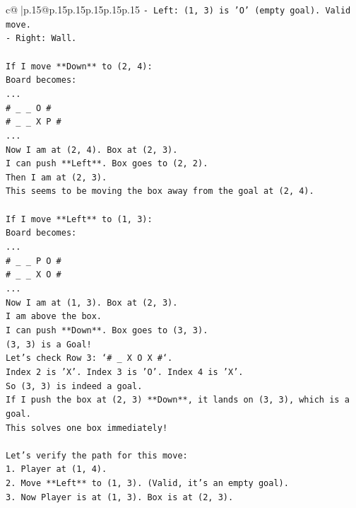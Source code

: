 \documentclass{article}
\begin{document}
{\begin{supertabular}{c@{$\;$}|p{.15\linewidth}@{}p{.15\linewidth}p{.15\linewidth}p{.15\linewidth}p{.15\linewidth}p{.15\linewidth}}
{{{\texttt{{-} Left: (1, 3) is 'O' (empty goal). Valid move.} \\
\texttt{{-} Right: Wall.} \\
\\ 
\texttt{If I move **Down** to (2, 4):} \\
\texttt{Board becomes:} \\
\texttt{...} \\
\texttt{\# \_ \_ O \#} \\
\texttt{\# \_ \_ X P \#} \\
\texttt{...} \\
\texttt{Now I am at (2, 4). Box at (2, 3).} \\
\texttt{I can push **Left**. Box goes to (2, 2).} \\
\texttt{Then I am at (2, 3).} \\
\texttt{This seems to be moving the box away from the goal at (2, 4).} \\
\\ 
\texttt{If I move **Left** to (1, 3):} \\
\texttt{Board becomes:} \\
\texttt{...} \\
\texttt{\# \_ \_ P O \#} \\
\texttt{\# \_ \_ X O \#} \\
\texttt{...} \\
\texttt{Now I am at (1, 3). Box at (2, 3).} \\
\texttt{I am above the box.} \\
\texttt{I can push **Down**. Box goes to (3, 3).} \\
\texttt{(3, 3) is a Goal!} \\
\texttt{Let's check Row 3: `\# \_ X O X \#`.} \\
\texttt{Index 2 is 'X'. Index 3 is 'O'. Index 4 is 'X'.} \\
\texttt{So (3, 3) is indeed a goal.} \\
\texttt{If I push the box at (2, 3) **Down**, it lands on (3, 3), which is a goal.} \\
\texttt{This solves one box immediately!} \\
\\ 
\texttt{Let's verify the path for this move:} \\
\texttt{1. Player at (1, 4).} \\
\texttt{2. Move **Left** to (1, 3). (Valid, it's an empty goal).} \\
\texttt{3. Now Player is at (1, 3). Box is at (2, 3).} \\
}}}
\end{supertabular}}
\end{document}
